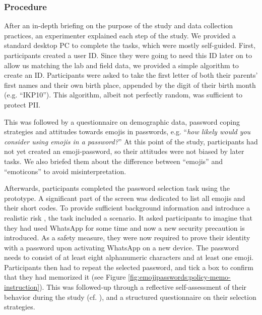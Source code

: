 \subsubsection{Procedure}
After an in-depth briefing on the purpose of the study and data collection practices, an experimenter explained each step of the study. We provided a standard desktop PC to complete the tasks, which were mostly self-guided. First, participants created a user ID. 
Since they were going to need this ID later on to allow us matching the lab and field data, we provided a simple algorithm to create an ID. Participants were asked to take the first letter of both their parents' first names and their own birth place, appended by the digit of their birth month (e.g. ``IKP10''). This algorithm, albeit not perfectly random, was sufficient to protect \acrlong{PII}.

This was followed by a questionnaire on demographic data, password coping strategies and attitudes towards emojis in passwords, e.g. ``\textit{how likely would you consider using emojis in a password?}'' At this point of the study, participants had not yet created an emoji-password, so their attitudes were not biased by later tasks. 
We also briefed them about the difference between ``emojis'' and ``emoticons'' to avoid misinterpretation. 

Afterwards, participants completed the password selection task using the prototype. A significant part of the screen was dedicated to list all emojis and their short codes. To provide sufficient background information and introduce a realistic risk \cite{Krol2016ExperimentDesign}, the task included a scenario. It asked participants to imagine that they had used WhatsApp for some time and now a new security precaution is introduced. As a safety measure, they were now required to prove their identity with a password upon activating WhatsApp on a new device. The password needs to consist of at least eight alphanumeric characters and at least one emoji. 
Participants then had to repeat the selected password, and tick a box to confirm that they had memorized it (see Figure \ref{fig:emojipasswords:policy-memo-instruction}). 
This was followed-up through a reflective self-assessment of their behavior during the study (cf. \cite{Fahl2013EcologicalValidityPasswordStudy}), and a structured questionnaire on their selection strategies. 

